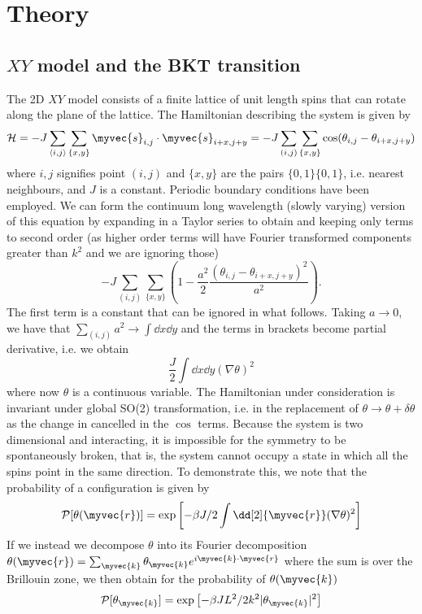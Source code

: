 \chapter{Theory}
\section{$XY$ model and the BKT transition}

The 2D $XY$ model consists of a finite lattice of unit length spins that can rotate along the plane of the lattice. The Hamiltonian describing the system is given by 
\[
\mathcal{H} = -J\sum_{\left <i,j \right>} \sum_{\{x,y\}} \myvec{s}_{i,j} \cdot \myvec{s}_{i+x,j+y} =
    -J\sum_{(i,j)} \sum_{\{x,y\}}  \cos( \theta_{i,j} - \theta_{i+x,j+y}) 
\]
 where $i, j$ signifies point $(i,j)$ and $\{x,y\}$ are the pairs $\{0,1\} \{0,1\}$, i.e. nearest neighbours, and $J$ is a constant. Periodic boundary conditions have been employed. We can form the continuum long wavelength (slowly varying) version of this equation by expanding in a Taylor series to obtain and keeping only terms to second order (as higher order terms will have Fourier transformed components greater than $k^2$ and we are ignoring those)
 \[
 -J\sum_{(i,j)} \sum_{\{x,y\}} \left ( 1 - \frac{a^2}{2} \frac{( \theta_{i,j} - \theta_{i+x,j+y})^2}{a^2} \right).
 \]
 The first term is a constant that can be ignored in what follows. Taking $a \to 0$, we have that $\sum_{(i,j)} a^2 \to \int \dd{x}\dd{y}$ and the terms in brackets become partial derivative, i.e. we obtain
 \[
 \frac{J}{2} \int \dd{x} \dd{y} (\nabla \theta)^2
 \]
 where now $\theta$ is a continuous variable. The Hamiltonian under consideration is invariant under global SO(2) transformation, i.e. in the replacement of $\theta \to \theta + \delta \theta$ as the change in cancelled in the $\cos$ terms. Because the system is two dimensional and interacting, it is impossible for the symmetry to be spontaneously broken, that is, the system cannot occupy a state in which all the spins point in the same direction. To demonstrate this, we note that the probability of a configuration is given by 
 \[
  \mathcal{P}[\theta(\myvec{r})] =   \exp \left [   -\beta J/2 \int \dd[2]{\myvec{r}} (\nabla \theta)^2 \right ]
 \] 
 If we instead we decompose  $\theta$ into its Fourier decomposition $\theta(\myvec{r}) = \sum_{\myvec{k}} \theta_{\myvec{k}} e^{i \myvec{k}\cdot \myvec{r}}$ where the sum is over the Brillouin zone, we then obtain for the probability of $\theta(\myvec{k})$
 \[
 \mathcal{P}[\theta_{\myvec{k}}] = \exp \left[-\beta J L^2/2 k^2 |\theta_{\myvec{k}}|^2 \right]
 \]
